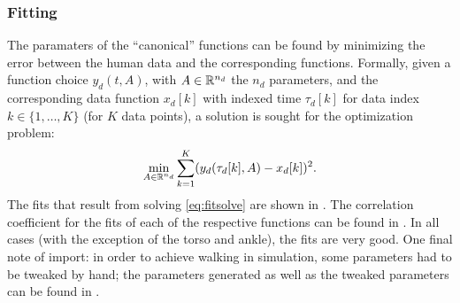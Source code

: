 
\subsubsection{Fitting} The paramaters of the ``canonical'' functions can be found by minimizing the error between the human data and the corresponding functions. Formally, given a function choice $y_d(t, A)$, with $A \in \mathbb{R}^{n_{d}}$ the $n_d$ parameters, and the corresponding data function $x_{d}[k]$ with indexed time $\tau_{d}[k]$ for data index $k \in \{1, \ldots, K\}$ (for $K$ data points),  a solution is sought for the optimization problem:
\begin{align}
  \label{eq:fitsolve}
  \min_{A \in \mathbb{R}^{n_{d}}} \sum_{k=1}^{K} (y_{d}(\tau_{d}[k], A) - x_{d}[k])^2.
\end{align}
The fits that result from solving \eqref{eq:fitsolve} are shown in . The correlation coefficient for the fits of each of the respective functions can be found in . In all cases (with the exception of the torso and ankle), the fits are very good. One final note of import: in order to achieve walking in simulation, some parameters had to be tweaked by hand; the parameters generated as well as the tweaked parameters can be found in .


